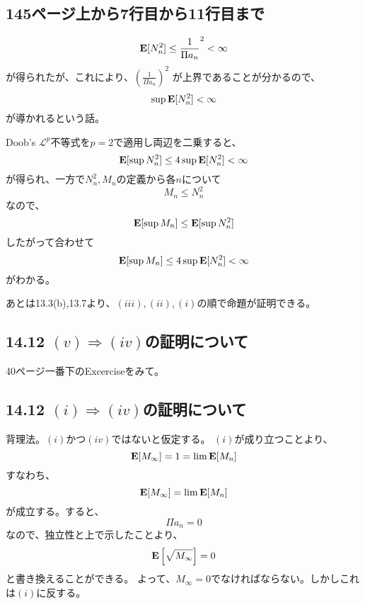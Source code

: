   \subsection{145ページ上から7行目から11行目まで}
    \[
      {\mathbf{E}}[N_n^2] \leq \frac{1}{\Pi a_n}^2 < \infty
    \]
    が得られたが、これにより、$\displaystyle{\left(\frac{1}{\Pi a_n}\right)^2}$
    が上界であることが分かるので、
    \[
      \sup {\mathbf{E}}[N_n^2] < \infty
    \]
    が導かれるという話。

    Doob's $\mathcal{L}^p$不等式を$p=2$で適用し両辺を二乗すると、
    \[
      {\mathbf{E}}[\sup N_n^2] \leq 4\sup{\mathbf{E}}[N_n^2] < \infty
    \]
    が得られ、一方で$N_n^2,M_n$の定義から各$n$について
    \[
      M_n \leq N_n^2
    \]
    なので、
    \[
      {\mathbf{E}}[\sup M_n] \leq {\mathbf{E}}[\sup N_n^2]
    \]
    したがって合わせて
    \[
      {\mathbf{E}}[\sup M_n] \leq 4\sup{\mathbf{E}}[N_n^2] < \infty
    \]
    がわかる。

    あとは13.3(b),13.7より、$(iii),(ii),(i)$の順で命題が証明できる。

  \subsection{14.12 $(v) \Rightarrow (iv)$の証明について}
    40ページ一番下のExcerciseをみて。
  \subsection{14.12 $(i) \Rightarrow (iv)$の証明について}
    背理法。$(i)$かつ$(iv)$ではないと仮定する。
    $(i)$が成り立つことより、
    \[
      {\mathbf{E}}[M_{\infty}] = 1 = \lim{\mathbf{E}}[M_n]
    \]
    すなわち、
    \[
      {\mathbf{E}}[M_{\infty}] = \lim{\mathbf{E}}[M_n]
    \]
    が成立する。すると、
    \[
      \Pi a_n = 0
    \]
    なので、独立性と上で示したことより、
    \[
      {\mathbf{E}} \left[ \sqrt{M_{\infty}} \right] = 0
    \]
    と書き換えることができる。
    よって、$M_{\infty} = 0$でなければならない。しかしこれは$(i)$に反する。

